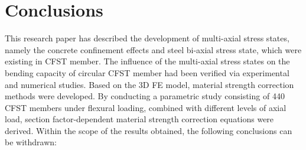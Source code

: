 \documentclass[12pt,a4]{article}
\begin{document}
	\section{Conclusions}
	This research paper has described the development of multi-axial stress states, namely the concrete confinement effects and steel bi-axial stress state, which were existing in CFST member. The influence of the multi-axial stress states on the bending capacity of circular CFST member had been verified via experimental and numerical studies. Based on the 3D FE model, material strength correction methods were developed. By conducting a parametric study consisting of 440 CFST members under flexural loading, combined with different levels of axial load, section factor-dependent material strength correction equations were derived.  Within the scope of the results obtained, the following conclusions can be withdrawn:
\end{document}
